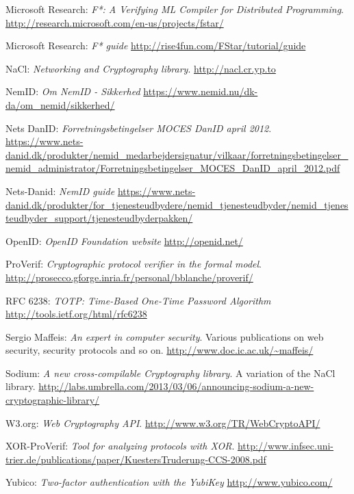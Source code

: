 \documentclass[twosided]{report}
\begin{document}
\begin{thebibliography}{9}
 Microsoft Research:
 \emph{F*: A Verifying ML Compiler for Distributed Programming}.
 \url{http://research.microsoft.com/en-us/projects/fstar/}

 Microsoft Research:
 \emph{F* guide}
 \url{http://rise4fun.com/FStar/tutorial/guide}

 NaCl:
 \emph{Networking and Cryptography library}.
 \url{http://nacl.cr.yp.to}

 NemID:
 \emph{Om NemID - Sikkerhed}
 \url{https://www.nemid.nu/dk-da/om_nemid/sikkerhed/}

 Nets DanID:
 \emph{Forretningsbetingelser MOCES DanID april 2012}.
 \url{https://www.nets-danid.dk/produkter/nemid_medarbejdersignatur/vilkaar/forretningsbetingelser_nemid_administrator/Forretningsbetingelser_MOCES_DanID_april_2012.pdf}

 Nets-Danid:
 \emph{NemID guide}
 \url{https://www.nets-danid.dk/produkter/for_tjenesteudbydere/nemid_tjenesteudbyder/nemid_tjenesteudbyder_support/tjenesteudbyderpakken/}

 OpenID:
 \emph{OpenID Foundation website}
 \url{http://openid.net/}

 ProVerif:
 \emph{Cryptographic protocol verifier in the formal model}.
 \url{http://prosecco.gforge.inria.fr/personal/bblanche/proverif/}

 RFC 6238:
 \emph{TOTP: Time-Based One-Time Password Algorithm}
 \url{http://tools.ietf.org/html/rfc6238}

 Sergio Maffeis:
 \emph{An expert in computer security}.
 Various publications on web security, security protocols and so on.
 \url{http://www.doc.ic.ac.uk/~maffeis/}

 Sodium:
 \emph{A new cross-compilable Cryptography library}.
 A variation of the NaCl library.
 \url{http://labs.umbrella.com/2013/03/06/announcing-sodium-a-new-cryptographic-library/}

 W3.org: 
 \emph{Web Cryptography API}.
 \url{http://www.w3.org/TR/WebCryptoAPI/}

 XOR-ProVerif:
 \emph{Tool for analyzing protocols with XOR}.
 \url{http://www.infsec.uni-trier.de/publications/paper/KuestersTruderung-CCS-2008.pdf}

 Yubico:
 \emph{Two-factor authentication with the YubiKey}
 \url{http://www.yubico.com/}

\end{thebibliography}
\end{document}
